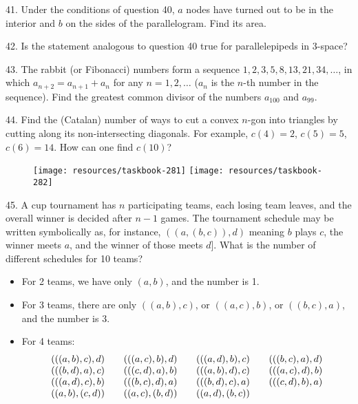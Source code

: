 \begin{problem}{41.}
Under the conditions of question 40, $a$ nodes have turned out to be in the interior and $b$ on the sides of the parallelogram. Find its area.
\end{problem}

\begin{problem}{42.}
Is the statement analogous to question 40 true for parallelepipeds in 3-space?
\end{problem}

\begin{problem}{43.}
The rabbit (or Fibonacci) numbers form a sequence $1,2,3,5,8,\allowbreak 13,21,34,\dotsc$, in which $a_{n+2}=a_{n+1}+a_n$ for any
$n=1,2,\dotsc$ ($a_n$ is the $n$-th number in the sequence). Find the greatest common divisor of the numbers $a_{100}$ and $a_{99}$.
\end{problem}

\begin{problem}{44.}
Find the (Catalan) number of ways to cut a convex $n$-gon into triangles by cutting along its non-intersecting diagonals.
For example, $c(4)=2$, $c(5)=5$, $c(6)=14$. How can one find $c(10)$?
\begin{figure}
	\texttt{[image: resources/taskbook-281]}
	\qquad
	\texttt{[image: resources/taskbook-282]}
\end{figure}
\end{problem}

\begin{problem}{45.}
A cup tournament has $n$ participating teams, each losing team leaves, and the overall winner is decided after $n-1$ games.
The tournament schedule may be written symbolically as, for instance,  $((a,(b,c)),d)$ meaning $b$ plays $c$, the winner meets $a$, and the winner of those meets $d$].
What is the number of different schedules for 10 teams?
\begin{itemize}
	\item For 2 teams, we have only $(a,b)$, and the number is 1.
	\item For 3 teams, there are only $((a,b),c)$, or $((a,c),b)$, or $((b,c),a)$, and the number is 3.
	\item For 4 teams:
	      \begin{equation*}
		      \begin{array}{@{}cccc@{}}
			      (((a,b),c),d) & \quad\;(((a,c),b),d) & \quad\;(((a,d),b),c) & \quad\;(((b,c),a),d) \\
			      (((b,d),a),c) & \quad\;(((c,d),a),b) & \quad\;(((a,b),d),c) & \quad\;(((a,c),d),b) \\
			      (((a,d),c),b) & \quad\;(((b,c),d),a) & \quad\;(((b,d),c),a) & \quad\;(((c,d),b),a) \\
			      ((a,b),(c,d)) & \quad\;((a,c),(b,d)) & \quad\;((a,d),(b,c))
		      \end{array}
	      \end{equation*}
\end{itemize}
\end{problem}

